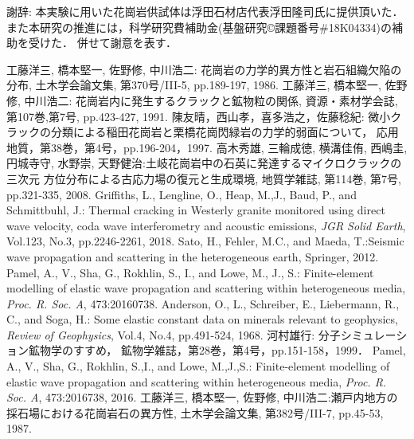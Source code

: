 \documentclass{jsce}
\begin{document}
{\gt 謝辞:}
本実験に用いた花崗岩供試体は浮田石材店代表浮田隆司氏に提供頂いた．
また本研究の推進には，科学研究費補助金(基盤研究©課題番号\#18K04334)の補助を受けた．
併せて謝意を表す．
\begin{thebibliography}{99}
\begin{spacing}{1.175}
	工藤洋三, 橋本堅一, 佐野修, 中川浩二: 花崗岩の力学的異方性と岩石組織欠陥の分布,
	土木学会論文集, 第370号/III-5, pp.189-197, 1986.
	工藤洋三, 橋本堅一, 佐野修, 中川浩二: 花崗岩内に発生するクラックと鉱物粒の関係,
	資源・素材学会誌, 第107巻,第7号, pp.423-427, 1991.
	陳友晴，西山孝，喜多浩之，佐藤稔紀: 微小クラックの分類による稲田花崗岩と栗橋花崗閃緑岩の力学的弱面について，
	応用地質，第38巻，第4号，pp.196-204，1997.
	高木秀雄, 三輪成徳, 横溝佳侑, 西嶋圭, 円城寺守, 水野崇, 天野健治:土岐花崗岩中の石英に発達するマイクロクラックの三次元
	方位分布による古応力場の復元と生成環境, 地質学雑誌, 第114巻, 第7号, pp.321-335, 2008.
	Griffiths, L., Lengline, O., Heap, M.,J., Baud, P., and Schmittbuhl, J.: Thermal cracking in Westerly granite monitored
	using direct wave velocity, coda wave interferometry and acoustic emissions, {\it JGR Solid Earth}, Vol.123, No.3, pp.2246-2261, 2018.
	Sato, H., Fehler, M.C., and Maeda, T.:Seismic wave propagation and scattering in the heterogeneous earth, 
	Springer, 2012.
	Pamel, A., V., Sha, G., Rokhlin, S., I., and Lowe, M., J., S.:
	Finite-element modelling of elastic wave propagation and scattering within heterogeneous media, 
	{\it Proc. R. Soc. A}, 473:20160738.
	Anderson, O., L., Schreiber, E., Liebermann, R., C., and Soga, H.: 
	Some elastic constant data on minerals relevant to geophysics, 
	{\it Review of Geophysics}, Vol.4, No.4, pp.491-524, 1968.
	河村雄行: 分子シミュレーション鉱物学のすすめ，
	鉱物学雑誌，第28巻，第4号，pp.151-158，1999．
	Pamel, A., V., Sha, G., Rokhlin, S.,I., and Lowe, M.,J.,S.: 
	Finite-element modelling of elastic wave propagation and scattering within heterogeneous media, 
	{\it Proc. R. Soc. A}, 473:2016738, 2016.
	工藤洋三, 橋本堅一, 佐野修, 中川浩二:瀬戸内地方の採石場における花崗岩石の異方性, 
	土木学会論文集, 第382号/III-7, pp.45-53, 1987.

\end{spacing}
\end{thebibliography}
\end{document}
